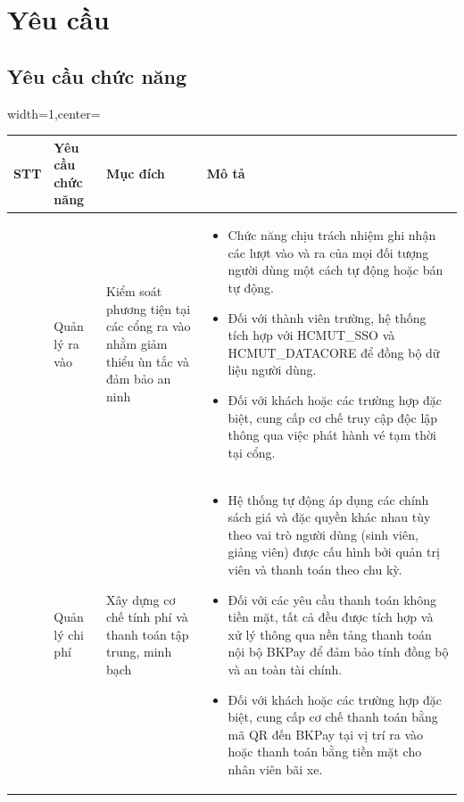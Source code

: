 \section{Yêu cầu}
\subsection{Yêu cầu chức năng}
\begin{adjustbox}{width=1\textwidth,center=\textwidth}
    \small
    \begin{tabular}{|>{\centering\arraybackslash}m{1cm}|>{\centering\arraybackslash}m{3cm}|>{\centering\arraybackslash}m{4.7cm}|>{\centering\arraybackslash}m{7cm}|}
    \hline
    \textbf{STT} & \textbf{Yêu cầu chức năng} & \textbf{Mục đích} & \textbf{Mô tả}\\
    \hline
    1 & Quản lý ra vào & Kiểm soát phương tiện tại các cổng ra vào nhằm giảm thiểu ùn tắc và đảm bảo an ninh & 
    \begin{itemize}[leftmargin=0pt, label={}]
        \item Chức năng chịu trách nhiệm ghi nhận các lượt vào và ra của mọi đối tượng người dùng một cách tự động hoặc bán tự động.
        \item Đối với thành viên trường, hệ thống tích hợp với HCMUT\_SSO và HCMUT\_DATACORE để đồng bộ dữ liệu người dùng.
        \item Đối với khách hoặc các trường hợp đặc biệt, cung cấp cơ chế truy cập độc lập thông qua việc phát hành vé tạm thời tại cổng.
    \end{itemize}
    \\
    \hline
    2 & Quản lý chi phí & Xây dựng cơ chế tính phí và thanh toán tập trung, minh bạch 
    &
    \begin{itemize}[leftmargin=0pt, label={}]
        \item Hệ thống tự động áp dụng các chính sách giá và đặc quyền khác nhau tùy theo vai trò người dùng (sinh viên, giảng viên) được cấu hình bởi quản trị viên và thanh toán theo chu kỳ.
        \item Đối với các yêu cầu thanh toán không tiền mặt, tất cả đều được tích hợp và xử lý thông qua nền tảng thanh toán nội bộ BKPay để đảm bảo tính đồng bộ và an toàn tài chính.
        \item Đối với khách hoặc các trường hợp đặc biệt, cung cấp cơ chế thanh toán bằng mã QR đến BKPay tại vị trí ra vào hoặc thanh toán bằng tiền mặt cho nhân viên bãi xe.
    \end{itemize}
    \\
    \hline
    \end{tabular}
\end{adjustbox}
